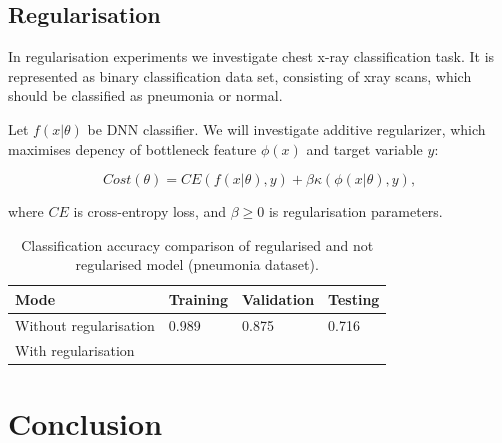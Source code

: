 \documentclass{article}
\begin{document}
\subsection{Regularisation}
In regularisation experiments we investigate chest x-ray classification task. It is represented as binary classification data set, consisting of xray scans, which should be classified as pneumonia or normal.

Let $f(x|\theta)$ be DNN classifier. We will investigate additive regularizer, which maximises depency of bottleneck feature $\phi(x)$ and target variable $y$: 

\begin{equation}
Cost(\theta) = CE(f(x|\theta),y) + \beta \kappa(\phi(x|\theta),y),
\end{equation}

\noindent where $CE$ is cross-entropy loss, and $\beta \geq 0$ is regularisation parameters.
\begin{table}	
	\centering
	\begin{tabular}{ |p{4cm}|p{2cm}|p{2cm}|p{2cm}| }
		\hline
		Mode & Training & Validation & Testing  \\
		\hline
		Without regularisation   &   0.989  &   0.875  &   0.716 \\		
		\hline
		With regularisation  &     &    &   \\		
		\hline
	\end{tabular}
	\caption{Classification accuracy comparison of regularised and not regularised model (pneumonia dataset).  }
	\label{table:regularisation_classification_accuracies}	
\end{table}

\section{Conclusion} 
\end{document}
